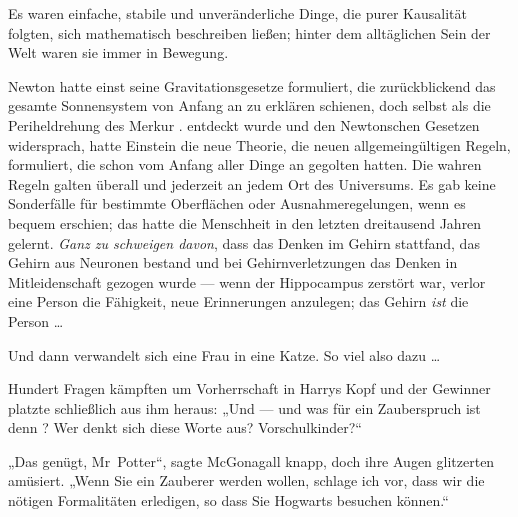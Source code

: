 Es waren einfache, stabile und unveränderliche Dinge, die purer Kausalität folgten, sich mathematisch beschreiben ließen; hinter dem alltäglichen Sein der Welt waren sie immer in Bewegung.

Newton hatte einst seine Gravitationsgesetze formuliert, die zurückblickend das gesamte Sonnensystem von Anfang an zu erklären schienen, doch selbst als die Periheldrehung des Merkur%
.
entdeckt wurde und den Newtonschen Gesetzen widersprach, hatte Einstein die neue Theorie, die neuen allgemeingültigen Regeln, formuliert, die schon vom Anfang aller Dinge an gegolten hatten. Die wahren Regeln galten überall und jederzeit an jedem Ort des Universums. Es gab keine Sonderfälle für bestimmte Oberflächen oder Ausnahmeregelungen, wenn es bequem erschien; das hatte die Menschheit in den letzten dreitausend Jahren gelernt. \emph{Ganz zu schweigen davon}, dass das Denken im Gehirn stattfand, das Gehirn aus Neuronen bestand und bei Gehirnverletzungen das Denken in Mitleidenschaft gezogen wurde — wenn der Hippocampus zerstört war, verlor eine Person die Fähigkeit, neue Erinnerungen anzulegen; das Gehirn \emph{ist} die Person …

Und dann verwandelt sich eine Frau in eine Katze. So viel also dazu …

Hundert Fragen kämpften um Vorherrschaft in Harrys Kopf und der Gewinner platzte schließlich aus ihm heraus:
„Und — und was für ein Zauberspruch ist denn ? Wer denkt sich diese Worte aus? Vorschulkinder?“

„Das genügt, Mr~Potter“, sagte McGonagall knapp, doch ihre Augen glitzerten amüsiert.
„Wenn Sie ein Zauberer werden wollen, schlage ich vor, dass wir die nötigen Formalitäten erledigen, so dass Sie Hogwarts besuchen können.“


